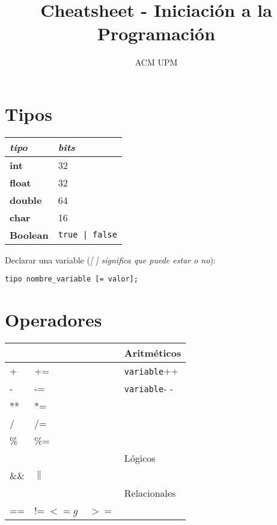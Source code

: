 \documentclass[10pt,twocolumn]{article}
\title{Cheatsheet - Iniciación a la Programación}
\author{ACM UPM}
\begin{document}
\maketitle

\section{Tipos}
\label{sec:tipos}

\begin{table}[h!]
  \centering
  \begin{tabular}[h]{p{3cm} p{3cm}}
    \hline
    \emph{tipo}     & \emph{bits} \\ \hline
    \textbf{int}    & 32 \\
    \textbf{float}  & 32 \\
    \textbf{double} & 64 \\
    \textbf{char}   & 16 \\
    \textbf{Boolean}& \texttt{true | false} \\ \hline
  \end{tabular}
\end{table}

Declarar una variable (\emph{[ ] significa que puede estar o no}):

\texttt{tipo nombre\_variable [= valor];}

\section{Operadores}
\label{sec:operadores}

\begin{table}[h]
  \begin{tabular}[h]{l l l}
    \hline
    && Aritméticos \\ \hline
    +    & +=   & \texttt{variable}++\\ 
    -    & -=   & \texttt{variable}- -\\
    **   & *=   & \\
    /    & /=   & \\
    \%   & \%=  & \\ \hline
    && Lógicos \\\hline
    \&\& & $\parallel$ & \\ \hline
    && Relacionales \\\hline
     ==  & != $<=g$ ~ $>=$  & \\
  \end{tabular}
\end{table}
\end{document}
